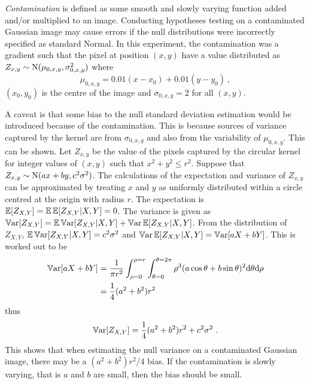 \emph{Contamination} is defined as some smooth and slowly varying function added and/or multiplied to an image. Conducting hypotheses testing on a contaminated Gaussian image may cause errors if the null distributions were incorrectly specified as standard Normal. In this experiment, the contamination was a gradient such that the pixel at position $(x,y)$ have a value distributed as $Z_{x,y}\sim\operatorname{N}(\mu_{0,x,y},\sigma_{0,x,y}^2)$ where
\begin{equation}
  \mu_{0,x,y} = 0.01 (x-x_0) + 0.01 (y-y_0) \ ,
\end{equation}
$(x_0,y_0)$ is the centre of the image and $\sigma_{0,x,y}=2$ for all $(x,y)$.

A caveat is that some bias to the null standard deviation estimation would be introduced because of the contamination. This is because sources of variance captured by the kernel are from $\sigma_{0,x,y}$ and also from the variability of $\mu_{0,x,y}$. This can be shown. Let $Z_{x,y}$ be the value of the pixels captured by the circular kernel for integer values of $(x,y)$ such that $x^2+y^2\leqslant r^2$. Suppose that $Z_{x,y}\sim\operatorname{N}(ax+by,c^2\sigma^2)$. The calculations of the expectation and variance of $Z_{x,y}$ can be approximated by treating $x$ and $y$ as uniformly distributed within a circle centred at the origin with radius $r$. The expectation is $\operatorname{\mathbb{E}}[Z_{X,Y}] = \operatorname{\mathbb{E}}\operatorname{\mathbb{E}}[Z_{X,Y}|X,Y]=0$. The variance is given as $\operatorname{\mathbb{V}ar}[Z_{X,Y}] = \operatorname{\mathbb{E}}\operatorname{\mathbb{V}ar}[Z_{X,Y}|X,Y] + \operatorname{\mathbb{V}ar}\operatorname{\mathbb{E}}[Z_{X,Y}|X,Y]$. From the distribution of $Z_{X,Y}$, $\operatorname{\mathbb{E}}\operatorname{\mathbb{V}ar}[Z_{X,Y}|X,Y] = c^2\sigma^2$ and $\operatorname{\mathbb{V}ar}\operatorname{\mathbb{E}}[Z_{X,Y}|X,Y]=\operatorname{\mathbb{V}ar}[aX+bY]$. This is worked out to be
\begin{align}
\operatorname{\mathbb{V}ar}[aX+bY] &= \dfrac{1}{\pi r^2}\int_{\rho=0}^{\rho=r}\int_{\theta=0}^{\theta=2\pi}
\rho^3(a\cos\theta + b\sin\theta)^2 \mathrm{d} \theta \mathrm{d} \rho
\nonumber\\
& = \dfrac{1}{4}(a^2+b^2)r^2
\end{align}
thus
\begin{equation}
\operatorname{\mathbb{V}ar}[Z_{X,Y}] = \dfrac{1}{4}(a^2+b^2)r^2 + c^2\sigma^2 \ .
\end{equation}
This shows that when estimating the null variance on a contaminated Gaussian image, there may be a $(a^2+b^2)r^2/4$ bias. If the contamination is slowly varying, that is $a$ and $b$ are small, then the bias should be small.

